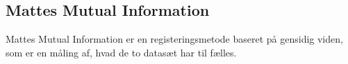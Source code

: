 \subsection{Mattes Mutual Information}


Mattes Mutual Information er en registeringsmetode baseret på gensidig
viden, som er en måling af, hvad de to datasæt har til fælles.





